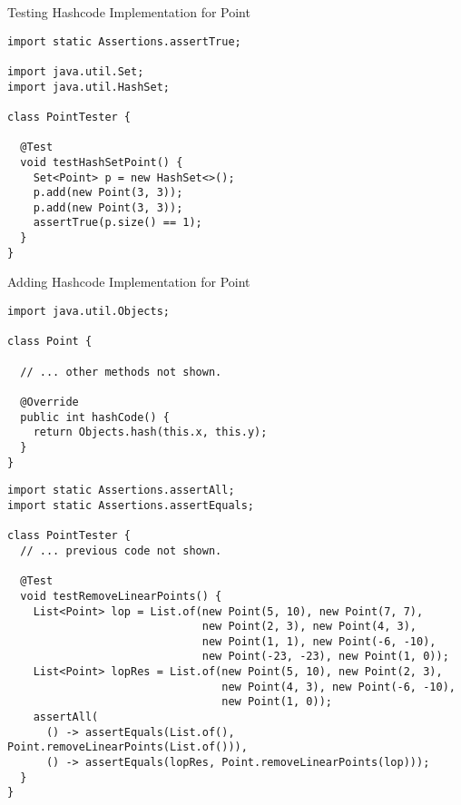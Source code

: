 \begin{cl}[]{Testing Hashcode Implementation for Point}
\begin{lstlisting}[language=MyJava]
import static Assertions.assertTrue;

import java.util.Set;
import java.util.HashSet;

class PointTester {

  @Test
  void testHashSetPoint() {
    Set<Point> p = new HashSet<>();
    p.add(new Point(3, 3));
    p.add(new Point(3, 3));
    assertTrue(p.size() == 1);
  }
}
\end{lstlisting}
\end{cl}

\begin{cl}[]{Adding Hashcode Implementation for Point}
\begin{lstlisting}[language=MyJava]
import java.util.Objects;

class Point {

  // ... other methods not shown.

  @Override
  public int hashCode() {
    return Objects.hash(this.x, this.y);
  }
}
\end{lstlisting}
\end{cl}


\begin{cl}[]{}
\begin{lstlisting}[language=MyJava]
import static Assertions.assertAll;
import static Assertions.assertEquals;

class PointTester {
  // ... previous code not shown. 

  @Test
  void testRemoveLinearPoints() {
    List<Point> lop = List.of(new Point(5, 10), new Point(7, 7),
                              new Point(2, 3), new Point(4, 3),
                              new Point(1, 1), new Point(-6, -10),
                              new Point(-23, -23), new Point(1, 0));
    List<Point> lopRes = List.of(new Point(5, 10), new Point(2, 3),
                                 new Point(4, 3), new Point(-6, -10),
                                 new Point(1, 0));
    assertAll(
      () -> assertEquals(List.of(), Point.removeLinearPoints(List.of())),
      () -> assertEquals(lopRes, Point.removeLinearPoints(lop)));
  }
}
\end{lstlisting}
\end{cl}

